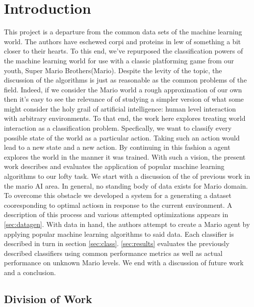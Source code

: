 \documentclass[]{article}   %
\begin{document}
\section{Introduction}     %
This project is a departure from the common data sets of the machine learning world. The authors have eschewed corpi and proteins in lew of something a bit closer to their hearts.  To this end, we've repurposed the classification powers of the machine learning world for use with a classic platforming game from our youth, Super Mario Brothers(Mario).  Despite the levity of the topic, the discussion of the algorithms is just as reasonable as the common problems of the field.  Indeed, if we consider the Mario world a rough approximation of our own then it's easy to see the relevance of of studying a simpler version of what some might consider the holy grail of artificial intelligence: human level interaction with arbitrary environments.
\newline\newline
To that end, the work here explores treating world interaction as a classification problem.  Specfically, we want to classify every possible state of the world as a particular action. Taking such an action would lead to a new state and a new action.  By continuing in this fashion a agent explores the world in the manner it was trained.
\newline\newline
With such a vision, the present work describes and evaluates the application of popular machine learning algorithms to our lofty task.  We start with a discussion of the of previous work in the mario AI area.  In general, no standing body of data exists for Mario domain.  To overcome this obstacle we developed a system for a generating a dataset cooresponding to optimal actiosn in response to the current environment.  A description of this process and various attempted optimizations appears in \ref{sec:datagen}.  With data in hand, the authors attempt to create a Mario agent by applying popular machine learning algorithms to said data.  Each classifier is described in turn in section \ref{sec:class}.  \ref{sec:results} evaluates the previously described classifiers using common performance metrics as well as actual performance on unknown Mario levels.  We end with a discussion of future work and a conclusion.

\subsection{Division of Work}
\end{document}
